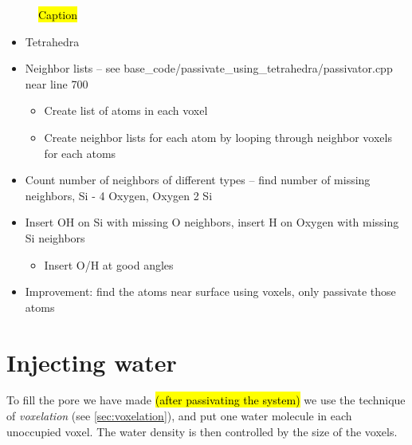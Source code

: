 \begin{figure}
\begin{subfigure}[b]{0.24\textwidth}
        \caption{}
    \end{subfigure}
    \caption{\hl{Caption}}
    \label{fig:passivation}
\end{figure}

\begin{itemize}
    \item Tetrahedra
    \item Neighbor lists -- see base\_code/passivate\_using\_tetrahedra/passivator.cpp near line 700
    \begin{itemize}
        \item Create list of atoms in each voxel
        \item Create neighbor lists for each atom by looping through neighbor voxels for each atoms
    \end{itemize}
    \item Count number of neighbors of different types -- find number of missing neighbors, Si - 4 Oxygen, Oxygen 2 Si
    \item Insert OH on Si with missing O neighbors, insert H on Oxygen with missing Si neighbors
    \begin{itemize}
        \item Insert O/H at good angles
    \end{itemize}
    \item Improvement: find the atoms near surface using voxels, only passivate those atoms
\end{itemize}

\section{Injecting water}
To fill the pore we have made \hl{(after passivating the system)} we use the technique of \emph{voxelation} (see \cref{sec:voxelation}), and put one water molecule in each unoccupied voxel. The water density is then controlled by the size of the voxels.

